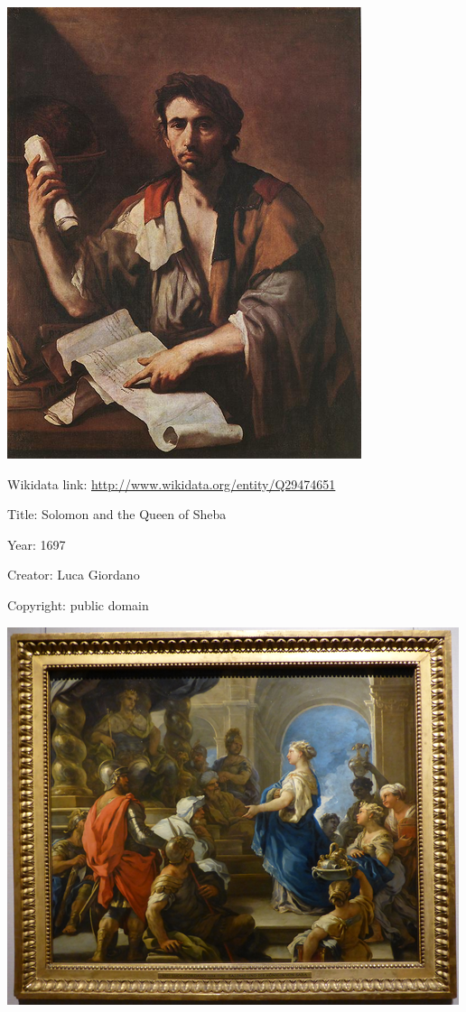 \documentclass[
  letterpaper,
]{book}
\begin{document}
\includegraphics{painting-collection_files/figure-pdf/cell-2-output-4.png}

Wikidata link: \url{http://www.wikidata.org/entity/Q29474651}

Title: Solomon and the Queen of Sheba

Year: 1697

Creator: Luca Giordano

Copyright: public domain

\includegraphics{painting-collection_files/figure-pdf/cell-2-output-6.png}


\backmatter
\end{document}
